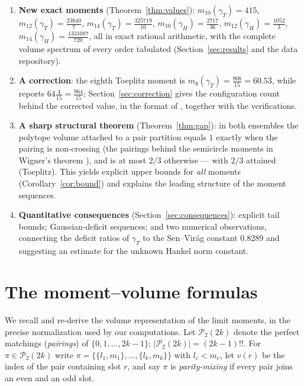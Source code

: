 ﻿\documentclass[11pt]{article}
\theoremstyle{remark}
\newcommand{\PP}{\mathcal{P}_2}
\newcommand{\gT}{\gamma_T}
\newcommand{\gH}{\gamma_H}
\begin{document}
\begin{enumerate}
\item \textbf{New exact moments} (Theorem~\ref{thm:values}): $m_{10}(\gT)=415$,
$m_{12}(\gT)=\tfrac{23840}{7}$, $m_{14}(\gT)=\tfrac{325719}{10}$,
$m_{10}(\gH)=\tfrac{2717}{36}$, $m_{12}(\gH)=\tfrac{1052}{3}$,
$m_{14}(\gH)=\tfrac{1331087}{720}$, all in exact rational arithmetic, with the
complete volume spectrum of every order tabulated (Section~\ref{sec:results} and the
data repository).
\item \textbf{A correction}: the eighth Toeplitz moment is
$m_8(\gT)=\tfrac{908}{15}=60.5\overline{3}$, while \cite{HM} reports
$64\tfrac4{15}=\tfrac{964}{15}$; Section~\ref{sec:correction} gives the configuration
count behind the corrected value, in the format of \cite{HM}, together with the
verifications.
\item \textbf{A sharp structural theorem}
(Theorem~\ref{thm:gap}): in both ensembles the polytope volume attached to a pair
partition equals $1$ exactly when the pairing is non-crossing (the pairings behind the
semicircle moments in Wigner's theorem \cite{Wigner}), and is at most $2/3$
otherwise --- with $2/3$ attained (Toeplitz). This yields explicit upper bounds for
\emph{all} moments (Corollary~\ref{cor:bound}) and explains the leading structure of
the moment sequences.
\item \textbf{Quantitative consequences} (Section~\ref{sec:consequences}): explicit
tail bounds; Gaussian-deficit sequences; and two numerical observations, connecting
the deficit ratios of $\gT$ to the Sen--Vir\'ag constant $0.8289$ and suggesting an
estimate for the unknown Hankel norm constant.
\end{enumerate}

\section{The moment--volume formulas}\label{sec:formulas}

We recall and re-derive the volume representation of the limit moments, in the precise
normalization used by our computations. Let $\PP(2k)$ denote the perfect matchings
(\emph{pairings}) of $\{0,1,\dots,2k-1\}$; $|\PP(2k)|=(2k-1)!!$. For
$\pi\in\PP(2k)$ write $\pi=\{\{l_1,m_1\},\dots,\{l_k,m_k\}\}$ with $l_c<m_c$, let
$v(r)$ be the index of the pair containing slot $r$, and say $\pi$ is
\emph{parity-mixing} if every pair joins an even and an odd slot.
\end{document}
